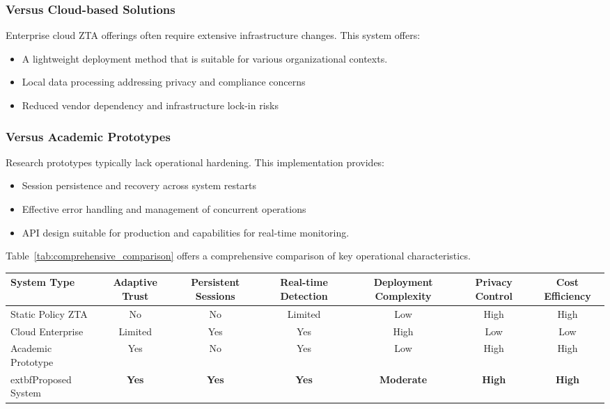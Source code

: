 \documentclass[conference]{IEEEtran}
\begin{document}
\subsubsection{Versus Cloud-based Solutions} 
Enterprise cloud ZTA offerings often require extensive infrastructure changes. This system offers:
\begin{itemize}[leftmargin=*]
  \item A lightweight deployment method that is suitable for various organizational contexts.
  \item Local data processing addressing privacy and compliance concerns
  \item Reduced vendor dependency and infrastructure lock-in risks
\end{itemize}

\subsubsection{Versus Academic Prototypes}
Research prototypes typically lack operational hardening. This implementation provides:
\begin{itemize}[leftmargin=*]
  \item Session persistence and recovery across system restarts
  \item Effective error handling and management of concurrent operations  
  \item API design suitable for production and capabilities for real-time monitoring.
\end{itemize}

Table~\ref{tab:comprehensive_comparison} offers a comprehensive comparison of key operational characteristics.

\begin{table*}[t]
\centering
\caption{Comprehensive comparison with existing ZTA approaches}
\begin{tabular}{@{}lcccccc@{}}
\toprule
\textbf{System Type} & \textbf{Adaptive Trust} & \textbf{Persistent Sessions} & \textbf{Real-time Detection} & \textbf{Deployment Complexity} & \textbf{Privacy Control} & \textbf{Cost Efficiency} \\
\midrule
Static Policy ZTA & No & No & Limited & Low & High & High \\
Cloud Enterprise & Limited & Yes & Yes & High & Low & Low \\
Academic Prototype & Yes & No & Yes & Low & High & High \\
	extbf{Proposed System} & \textbf{Yes} & \textbf{Yes} & \textbf{Yes} & \textbf{Moderate} & \textbf{High} & \textbf{High} \\
\bottomrule
\end{tabular}
\label{tab:comprehensive_comparison}
\end{table*}
\end{document}
